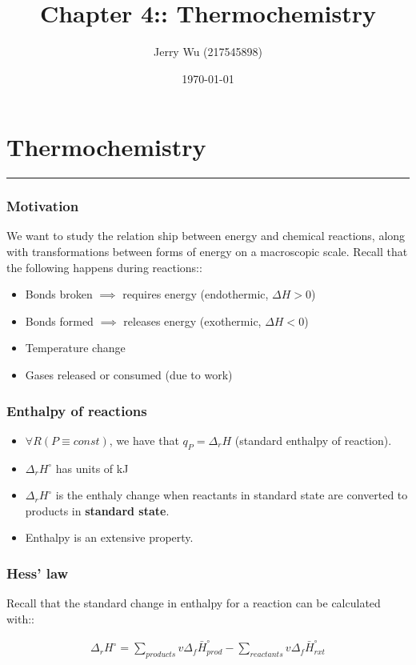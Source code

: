 \documentclass[12pt]{book}
\title{Chapter 4:: Thermochemistry}
\author{Jerry Wu (217545898)}
\date{\today}
\begin{document}
\maketitle
\chapter*{Thermochemistry}
\rule{\textwidth}{0.4pt}

\subsection*{Motivation}
We want to study the relation ship between energy and chemical reactions, along with transformations between forms of energy on a macroscopic scale. Recall that the following happens during reactions::

\begin{itemize}
    \item Bonds broken $\implies$ requires energy (endothermic, $\Delta H>0$)
    \item Bonds formed $\implies$ releases energy (exothermic, $\Delta H<0$)
    \item Temperature change
    \item Gases released or consumed (due to work)
\end{itemize}

\subsection*{Enthalpy of reactions}
\begin{itemize}
    \item $\forall R(P\equiv const)$, we have that $q_P=\Delta_r H$ (standard enthalpy of reaction).
    \item $\Delta_r H^{\circ}$ has units of kJ
    \item $\Delta_r H^{\circ}$ is the enthaly change when reactants in standard state are converted to products in \textbf{standard state}.
    \item Enthalpy is an extensive property.
\end{itemize}

\subsection*{Hess' law}

Recall that the standard change in enthalpy for a reaction can be calculated with::

\begin{align*}
    \Delta_r H^{\circ}=\sum_{products} v\Delta_f \bar{H}^{\circ}_{prod}-\sum_{reactants} v\Delta_f \bar{H}^{\circ}_{rxt}
\end{align*}
\end{document}
